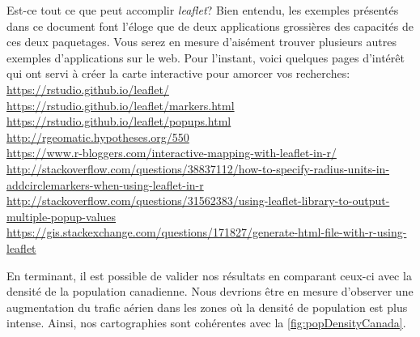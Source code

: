 \begin{moreInfo}{Est-ce tout ce que peut accomplir \emph{leaflet}?}
	Bien entendu, les exemples présentés dans ce document font l'éloge que de deux applications grossières des capacités de ces deux paquetages. Vous serez en mesure d'aisément trouver plusieurs autres exemples d'applications sur le web. Pour l'instant, voici quelques pages d'intérêt qui ont servi à créer la carte interactive pour amorcer vos recherches: \\
	\url{https://rstudio.github.io/leaflet/} \\
	\url{https://rstudio.github.io/leaflet/markers.html} \\
	\url{https://rstudio.github.io/leaflet/popups.html} \\
	\url{http://rgeomatic.hypotheses.org/550} \\
	\url{https://www.r-bloggers.com/interactive-mapping-with-leaflet-in-r/} \\
	\url{http://stackoverflow.com/questions/38837112/how-to-specify-radius-units-in-addcirclemarkers-when-using-leaflet-in-r} \\
	\url{http://stackoverflow.com/questions/31562383/using-leaflet-library-to-output-multiple-popup-values} \\
	\url{https://gis.stackexchange.com/questions/171827/generate-html-file-with-r-using-leaflet}
\end{moreInfo}

En terminant, il est possible de valider nos résultats en comparant ceux-ci avec la densité de la population canadienne. Nous devrions être en mesure d'observer une augmentation du trafic aérien dans les zones où la densité de population est plus intense. Ainsi, nos cartographies sont cohérentes avec la \autoref{fig:popDensityCanada}.

